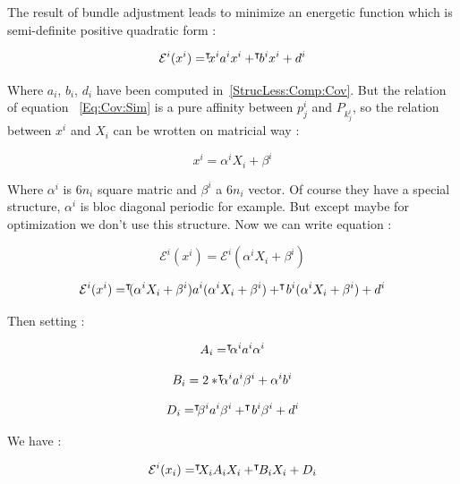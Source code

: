 The result of bundle adjustment  leads to minimize an energetic function 
which is semi-definite positive quadratic form :

\begin{equation}
    \mathcal{E}^i (x^i) =    ^{\intercal} \!\!\! {x^i}   a^i x^i  +   ^{\intercal} \!\! {b^i}   x^i   + d^i
\end{equation}

Where $a_i$, $b_i$, $d_i$  have been computed in~\ref{StrucLess:Comp:Cov}.
But the relation of equation ~\ref{Eq:Cov:Sim} is a pure affinity between $p^i_j$
and $P_{k^i_j}$, so the relation between $x^i$ and $X_i$  can be wrotten on matricial way :

\begin{equation}
    x^i =    \alpha^i X_i + \beta^i
\end{equation}

Where $\alpha^i$ is $6n_i$ square matric and $\beta^i$ a $6n_i$ vector.
Of course they have a special structure, $\alpha^i$ is bloc diagonal periodic for example.
But except maybe for optimization we don't use this structure.
Now we can write equation :

\begin{equation}
    \mathcal{E}^i (x^i) =    \mathcal{E}^i (\alpha^i X_i + \beta^i)
\end{equation}

\begin{equation}
    \mathcal{E}^i (x^i) =     ^{\intercal} \!\!\! (\alpha^i X_i + \beta^i) a^i (\alpha^i X_i + \beta^i) +  ^{\intercal} \! {b^i}   (\alpha^i X_i + \beta^i)  + d^i
\end{equation}

Then setting :

\begin{equation}
     A_i =     ^{\intercal} \!\!\! \alpha^i  a^i \alpha^i
\end{equation}

\begin{equation}
     B_i =       2*  ^{\intercal} \!\!\! \alpha^i  a^i  \beta^i     + \alpha^i b^i
\end{equation}

\begin{equation}
     D_i =        ^{\intercal} \!\!\! \beta^i  a^i  \beta^i  +  ^{\intercal} \!{b^i} \beta^i +        d^i
\end{equation}

We have :

\begin{equation}
    \mathcal{E}^i (x_i) =    ^{\intercal} \!\!\! {X_i}   A_i X_i  +   ^{\intercal} \!\! {B_i}   X_i   + D_i
\end{equation}

